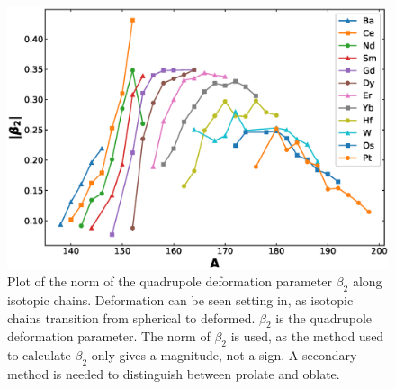 \begin{figure}[!]
    \centering
    \includegraphics[scale=0.5]{Introduction_Figs/beta.eps}
    \caption{Plot of the norm of the quadrupole deformation parameter $\beta_2$ along isotopic chains. Deformation can be seen setting in, as isotopic chains transition from spherical to deformed. $\beta_2$ is the quadrupole deformation parameter. The norm of $\beta_2$ is used, as the method used to calculate $\beta_2$ only gives a magnitude, not a sign. A secondary method is needed to distinguish between prolate and oblate.}
    \label{fig:beta_by_isotope}
\end{figure}